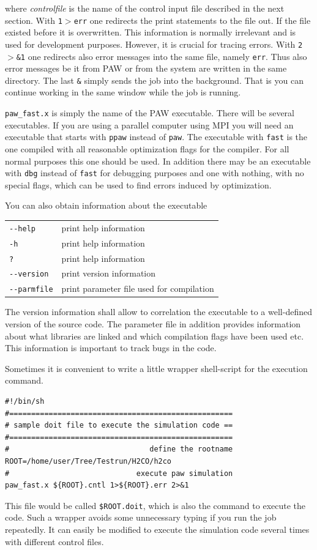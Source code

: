 \documentclass[final,12pt,makeidx,DIV=calc]{article}
\begin{document}
\noindent where {\it controlfile} is the name of the control input
file described in the next section.  With {\tt 1$>$err} one redirects
the print statements to the file out. If the file existed before it is
overwritten. This information is normally irrelevant and is used for
development purposes. However, it is crucial for tracing errors.  With
{\tt 2$>$\&1} one redirects also error messages into the same file,
namely {\tt err}. Thus also error messages be it from PAW or from the
system are written in the same directory. The last {\tt \&} simply
sends the job into the background. That is you can continue working in
the same window while the job is running.

{\tt paw\_fast.x} is simply the name of the PAW executable. There will
be several executables. If you are using a parallel computer using MPI
you will need an executable that starts with {\tt ppaw} instead of
{\tt paw}. The executable with {\tt fast} is the one compiled with all
reasonable optimization flags for the compiler. For all normal
purposes this one should be used. In addition there may be an
executable with {\tt dbg} instead of {\tt fast} for debugging purposes
and one with nothing, with no special flags, which can be used to find
errors induced by optimization.

You can also obtain information about the executable
\begin{center}
\begin{tabular}{ll}
\verb+--help+ & print help information \\
\verb+-h+ & print help information \\
\verb+?+ & print help information \\
\verb+--version+ & print version information\\
\verb+--parmfile+ & print parameter file used for compilation\\
\end{tabular}
\end{center}
The version information shall allow to correlation the executable to a
well-defined version of the source code. The parameter file in
addition provides information about what libraries are linked and
which compilation flags have been used etc. This information is
important to track bugs in the code.

Sometimes it is convenient to write a little wrapper shell-script for
the execution command.
\begin{verbatim}
#!/bin/sh
#===================================================
# sample doit file to execute the simulation code ==
#===================================================
#                                define the rootname 
ROOT=/home/user/Tree/Testrun/H2CO/h2co                               
#                             execute paw simulation
paw_fast.x ${ROOT}.cntl 1>${ROOT}.err 2>&1
\end{verbatim}
This file would be called {\tt \${ROOT}.doit}, which is
also the command to execute the code.  Such a wrapper avoids some
unnecessary typing if you run the job repeatedly. It can easily be
modified to execute the simulation code several times with different
control files.
\end{document}
